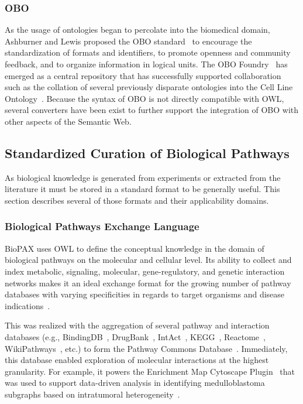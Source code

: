 \subsubsection{OBO}

As the usage of ontologies began to percolate into the biomedical domain, Ashburner and Lewis proposed the \ac{OBO} standard~\cite{Ashburner2003} to encourage the standardization of formats and identifiers, to promote openness and community feedback, and to organize information in logical units.
The OBO Foundry~\cite{Smith2007} has emerged as a central repository that has successfully supported collaboration such as the collation of several previously disparate ontologies into the Cell Line Ontology~\cite{Sarntivijai2014}.
Because the syntax of \ac{OBO} is not directly compatible with \ac{OWL}, several converters have been exist to further support the integration of \ac{OBO} with other aspects of the Semantic Web.

\subsection{Standardized Curation of Biological Pathways}

As biological knowledge is generated from experiments or extracted from the literature it must be stored in a standard format to be generally useful.
This section describes several of those formats and their applicability domains.

\subsubsection{Biological Pathways Exchange Language}

\ac{BioPAX} uses \ac{OWL} to define the conceptual knowledge in the domain of biological pathways on the molecular and cellular level.
Its ability to collect and index metabolic, signaling, molecular, gene-regulatory, and genetic interaction networks makes it an ideal exchange format for the growing number of pathway databases with varying specificities in regards to target organisms and disease indications~\cite{Demir2010}.

This was realized with the aggregation of several pathway and interaction databases (e.g., BindingDB~\cite{Gilson2016}, DrugBank~\cite{Law2014}, IntAct~\cite{Orchard2014}, \ac{KEGG}~\cite{Kanehisa2017}, Reactome~\cite{Fabregat2016}, WikiPathways~\cite{Pico2008}, etc.) to form the Pathway Commons Database~\cite{Cerami2011}.
Immediately, this database enabled exploration of molecular interactions at the highest granularity.
For example, it powers the Enrichment Map Cytoscape Plugin~\cite{Merico2010} that was used to support data-driven analysis in identifying medulloblastoma subgraphs based on intratumoral heterogeneity~\cite{Cavalli2017}.

